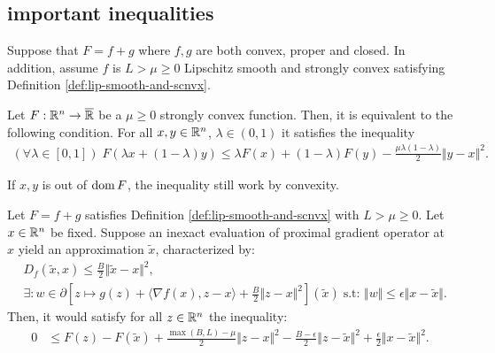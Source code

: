 \documentclass[12pt]{article}
\begin{document}
    \subsection{important inequalities}
        \begin{assumption}\label{ass:smooth-plus-nonsmooth}
            Suppose that $F = f + g$ where $f, g$ are both convex, proper and closed. 
            In addition, assume $f$ is $L > \mu \ge 0$ Lipschitz smooth and strongly convex satisfying Definition \ref{def:lip-smooth-and-scnvx}. 
        \end{assumption}
        \begin{theorem}\label{thm:jesen}
            Let $F: \mathbb R^n \rightarrow \overline {\mathbb R}$ be a $\mu \ge 0$ strongly convex function. 
            Then, it is equivalent to the following condition. 
            For all $x, y \in \mathbb R^n$, $\lambda \in (0, 1)$ it satisfies the inequality 
            \begin{align*}
                (\forall \lambda \in [0, 1])\; 
                F(\lambda x + (1 - \lambda)y) \le \lambda F(x) + (1 - \lambda)F(y) -\frac{\mu\lambda(1 - \lambda)}{2} \Vert y - x\Vert^2. 
            \end{align*}
        \end{theorem}
        \begin{remark}
            If $x, y$ is out of $\operatorname{dom} F$, the inequality still work by convexity. 
        \end{remark}
        \begin{lemma}\label{lemma:inex-pg-ineq}
            Let $F = f + g$ satisfies Definition \ref{def:lip-smooth-and-scnvx} with $L > \mu \ge 0$. 
            Let $x \in \mathbb R^n$ be fixed. 
            Suppose an inexact evaluation of proximal gradient operator at $x$ yield an approximation $\tilde x$, characterized by: 
            \begin{align*}
                & D_f(\tilde x, x) \le \frac{B}{2}\Vert \tilde x - x\Vert^2, 
                \\
                & \exists: w \in \partial \left[
                    z \mapsto  g(z) + \langle \nabla f(x), z - x\rangle + \frac{B}{2}\Vert z - x\Vert^2
                \right](\tilde x)\; \text{s.t: } \Vert w\Vert \le \epsilon \Vert x - \tilde x\Vert. 
            \end{align*}
            Then, it would satisfy for all $z\in \mathbb R^n$ the inequality: 
            \begin{align*}
                0 &\le 
                F(z) - F(\tilde x) + \frac{\max(B, L) - \mu}{2}\Vert z - x\Vert^2
                - \frac{B - \epsilon}{2}\Vert z - \tilde x\Vert^2
                + \frac{\epsilon}{2}\Vert x - \tilde x \Vert^2. 
            \end{align*}
        \end{lemma}
\end{document}
